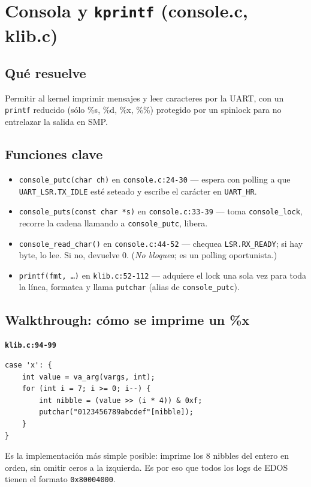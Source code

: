 \documentclass[11pt,a4paper]{article}
\begin{document}
\section{Consola y \texttt{kprintf} (console.c, klib.c)}

\subsection*{Qué resuelve}

Permitir al kernel imprimir mensajes y leer caracteres por la UART,
con un \texttt{printf} reducido (sólo \%s, \%d, \%x, \%\%) protegido
por un spinlock para no entrelazar la salida en SMP.

\subsection*{Funciones clave}

\begin{itemize}[leftmargin=*]
    \item \texttt{console\_putc(char ch)} en \texttt{console.c:24-30}
        — espera con polling a que \texttt{UART\_LSR.TX\_IDLE} esté
        seteado y escribe el carácter en \texttt{UART\_HR}.
    \item \texttt{console\_puts(const char *s)} en
        \texttt{console.c:33-39} — toma \texttt{console\_lock},
        recorre la cadena llamando a \texttt{console\_putc}, libera.
    \item \texttt{console\_read\_char()} en \texttt{console.c:44-52}
        — chequea \texttt{LSR.RX\_READY}; si hay byte, lo lee. Si
        no, devuelve 0. (\emph{No bloquea}; es un polling oportunista.)
    \item \texttt{printf(fmt, \ldots)} en \texttt{klib.c:52-112} —
        adquiere el lock una sola vez para toda la línea, formatea
        y llama \texttt{putchar} (alias de \texttt{console\_putc}).
\end{itemize}

\subsection*{Walkthrough: cómo se imprime un \%x}

\begin{walkthrough}
\textbf{\texttt{klib.c:94-99}}

\begin{lstlisting}[style=cstyle]
case 'x': {
    int value = va_arg(vargs, int);
    for (int i = 7; i >= 0; i--) {
        int nibble = (value >> (i * 4)) & 0xf;
        putchar("0123456789abcdef"[nibble]);
    }
}
\end{lstlisting}

Es la implementación más simple posible: imprime los 8 nibbles del
entero en orden, sin omitir ceros a la izquierda. Es por eso que
todos los logs de EDOS tienen el formato \texttt{0x80004000}.
\end{walkthrough}
\end{document}
